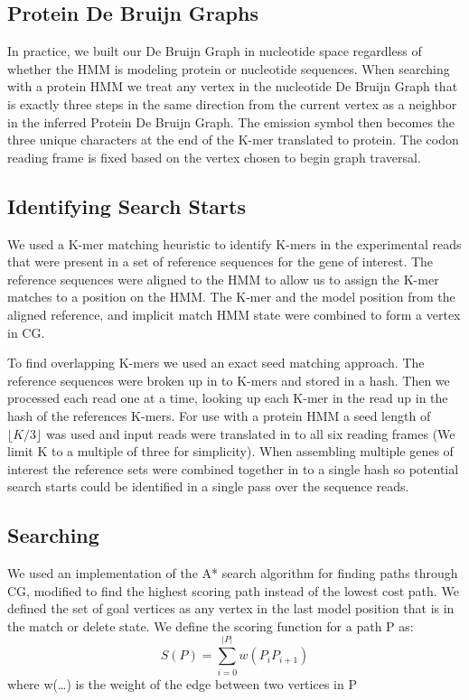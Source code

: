 \documentclass[10pt]{bmc_article}
\newenvironment{bmcformat}{\begin{raggedright}\baselineskip20pt\sloppy\setboolean{publ}{false}}{\end{raggedright}\baselineskip20pt\sloppy}
\begin{document}
\begin{bmcformat}
\subsection*{Protein De Bruijn Graphs}
In practice, we built our De Bruijn Graph in nucleotide space regardless of whether the HMM is modeling protein or nucleotide sequences.  When searching with a protein HMM we treat any vertex in the nucleotide De Bruijn Graph that is exactly three steps in the same direction from the current vertex as a neighbor in the inferred Protein De Bruijn Graph.  The emission symbol then becomes the three unique characters at the end of the K-mer translated to protein.  The codon reading frame is fixed based on the vertex chosen to begin graph traversal.

\subsection*{Identifying Search Starts}
We used a K-mer matching heuristic to identify K-mers in the experimental reads that were present in a set of reference sequences for the gene of interest.  The reference sequences were aligned to the HMM to allow us to assign the K-mer matches to a position on the HMM.  The K-mer and the model position from the aligned reference, and implicit match HMM state were combined to form a vertex in CG.

To find overlapping K-mers we used an exact seed matching approach. The reference sequences were broken up in to K-mers and stored in a hash. Then we processed each read one at a time, looking up each K-mer in the read up in the hash of the references K-mers.  For use with a protein HMM a seed length of $\lfloor K/3\rfloor$ was used and input reads were translated in to all six reading frames (We limit K to a multiple of three for simplicity). When assembling multiple genes of interest the reference sets were combined together in to a single hash so potential search starts could be identified in a single pass over the sequence reads.

\subsection*{Searching}
We used an implementation of the A* search algorithm\cite{Hart1968} for finding paths through CG, modified to find the highest scoring
path instead of the lowest cost path. We defined the set of goal vertices as any vertex in the last model position that is in the 
match or delete state.  We define the scoring function for a path P as: \[S(P) = \sum_{i=0}^{|P|}w(P_iP_{i+1})\] 
where w(\ldots) is the weight of the edge between two vertices in P


\end{bmcformat}
\end{document}
